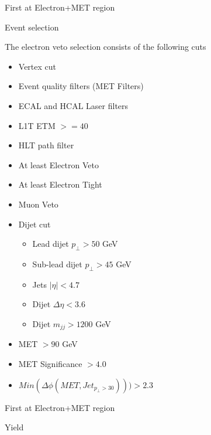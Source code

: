 \documentclass[8pt]{beamer}
\begin{document}
\begin{frame}{First at Electron+MET region} 
 
\begin{block}{Event selection}

The electron veto selection consists of the following cuts
\begin{itemize}
  \item Vertex cut 
  \item Event quality filters (MET Filters)
  \item ECAL and HCAL Laser filters
  \item L1T ETM $>=40$
  \item HLT path filter
  \item At least Electron Veto
  \item At least Electron Tight
  \item Muon Veto
  \item Dijet cut
  \begin{itemize}
      \item Lead dijet $ p_{\perp} > 50$ GeV
      \item Sub-lead dijet $ p_{\perp} > 45$ GeV
      \item Jets $ |\eta| < 4.7 $
      \item Dijet $ \Delta\eta < 3.6 $
      \item Dijet $ m_{jj} > 1200 $ GeV
  \end{itemize}
  \item MET $> 90$ GeV
  \item MET Significance $> 4.0$
  \item $ Min(\Delta\phi(MET,Jet_{p_{\perp}>30})))>2.3 $
\end{itemize}

\end{block}

\end{frame}

\begin{frame}{First at Electron+MET region} 
 
\begin{block}{Yield}

\centering
\resizebox{1.0\linewidth}{!}{

}

\end{block}

\end{frame}
\end{document}
